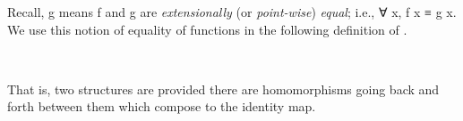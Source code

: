 Recall,   \ab g means \ab f and \ab g are   %
\emph{extensionally} (or \emph{point-wise}) \emph{equal}; i.e., \as ∀ \ab x, \ab f \ab x \aod ≡ \ab g \ab x. We use this notion of equality of functions in the following definition of .
\ccpad
\begin{code}%
\>[0]\AgdaSpace{}%
\AgdaSymbol{:}\AgdaSpace{}%
\AgdaSymbol{\{}\AgdaSpace{}%
\AgdaSpace{}%
\AgdaSymbol{:}\AgdaSpace{}%
\AgdaSymbol{\}(}\AgdaSpace{}%
\AgdaSymbol{:}\AgdaSpace{}%
\AgdaSpace{}%
\AgdaSpace{}%
\AgdaSymbol{)(}\AgdaSpace{}%
\AgdaSymbol{:}\AgdaSpace{}%
\AgdaSpace{}%
\AgdaSpace{}%
\AgdaSymbol{)}\AgdaSpace{}%
\AgdaSpace{}%
\AgdaSpace{}%
\AgdaSpace{}%
\AgdaSpace{}%
\AgdaSpace{}%
\AgdaSpace{}%
\AgdaSpace{}%
\AgdaSpace{}%
\<%
\\
\>[0]\AgdaSpace{}%
\AgdaSpace{}%
\AgdaSpace{}%
\AgdaSymbol{=}%
\>[9]\AgdaSpace{}%
\AgdaSpace{}%
\AgdaSpace{}%
\AgdaSymbol{(}\AgdaSpace{}%
\AgdaSpace{}%
\AgdaSymbol{)}\AgdaSpace{}%
\AgdaFunction{,}\AgdaSpace{}%
\AgdaSpace{}%
\AgdaSpace{}%
\AgdaSpace{}%
\AgdaSymbol{(}\AgdaSpace{}%
\AgdaSpace{}%
\AgdaSymbol{)}%
\>[73I]\AgdaFunction{,}\AgdaSpace{}%
\AgdaSymbol{(}\AgdaSpace{}%
\AgdaSpace{}%
\AgdaSpace{}%
\AgdaSpace{}%
\AgdaSpace{}%
\AgdaSpace{}%
\AgdaSpace{}%
\AgdaSpace{}%
\AgdaSpace{}%
\AgdaSpace{}%
\AgdaSpace{}%
\AgdaSymbol{)}\AgdaSpace{}%
\AgdaSpace{}%
\AgdaSymbol{(}\AgdaSpace{}%
\AgdaSpace{}%
\AgdaSpace{}%
\AgdaSpace{}%
\AgdaSpace{}%
\AgdaSpace{}%
\AgdaSpace{}%
\AgdaSpace{}%
\AgdaSpace{}%
\AgdaSpace{}%
\AgdaSpace{}%
\AgdaSymbol{)}\<%
\end{code}
\ccpad
That is, two structures are  provided there are homomorphisms going back and forth between them which compose to the identity map.

